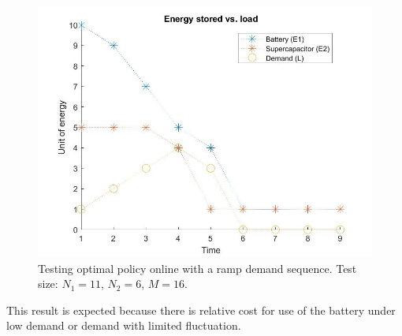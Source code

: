 \documentclass[conference]{IEEEtran}
\begin{document}
\begin{figure}[htbp]
\centerline{\includegraphics[scale=0.25]{EnergyStoredvsload_RampLoad(E1_max=10,E2_max=5).jpg}}
\caption{Testing optimal policy online with a ramp demand sequence. Test size: $N_{1}=11$, $N_{2}=6$, $M=16$.}
\label{fig:RampDemand}
\end{figure} This result is expected because there is relative cost for use of the battery under low demand or demand with limited fluctuation.
\end{document}
